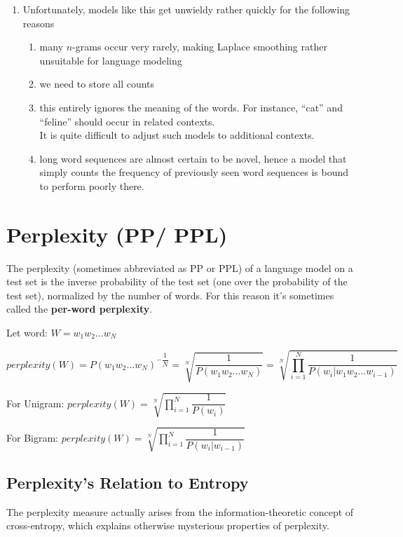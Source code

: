 \begin{enumerate}
    \item Unfortunately, models like this get unwieldy rather quickly for the following reasons
    \begin{enumerate}
        \item many $n$-grams occur very rarely, making Laplace smoothing rather unsuitable for language modeling

        \item we need to store all counts

        \item this entirely ignores the meaning of the words. For instance, “cat” and “feline” should occur in related contexts.\\
        It is quite difficult to adjust such models to additional contexts.

        \item long word sequences are almost certain to be novel, hence a model that simply counts the frequency of previously seen word sequences is bound to perform poorly there.
    \end{enumerate}
\end{enumerate}




\section{Perplexity (PP/ PPL) \cite{nlp-1}}

The perplexity (sometimes abbreviated as PP or PPL) of a language model on a test set is the inverse probability of the test set (one over the probability of the test set), normalized by the number of words. For this reason it’s sometimes called the \textbf{per-word perplexity}.

Let word: \(W = w_1w_2 ...w_N\)

\[
    perplexity(W) = P(w_1w_2 ...w_N)^{-\dfrac{1}{N}} = \sqrt[N]{\dfrac{1}{P(w_1w_2 ...w_N)}} = \sqrt[N]{\prod_{i=1}^{N} \dfrac{1}{P(w_i|w_1w_2 ...w_{i-1})}}
\]

For Unigram:
\(
   \displaystyle perplexity(W) = \sqrt[N]{\prod_{i=1}^{N} \dfrac{1}{P(w_i)}}
\)

\vspace{0.2cm}

For Bigram:
\(
   \displaystyle perplexity(W) = \sqrt[N]{\prod_{i=1}^{N} \dfrac{1}{P(w_i|w_{i-1})}}
\)

\subsection{Perplexity’s Relation to Entropy}
The perplexity measure actually arises from the information-theoretic concept of cross-entropy, which explains otherwise mysterious properties of perplexity.

